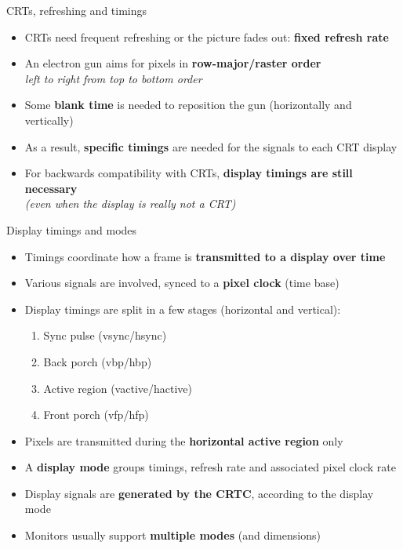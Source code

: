 \begin{frame}{CRTs, refreshing and timings}
  \begin{itemize}
  \item CRTs need frequent refreshing or the picture fades out: \textbf{fixed refresh rate}
  \item An electron gun aims for pixels in \textbf{row-major/raster order}\\
  \textit{left to right from top to bottom order}
  \item Some \textbf{blank time} is needed to reposition the gun (horizontally and vertically)
  \item As a result, \textbf{specific timings} are needed for the signals to each CRT display
  \item For backwards compatibility with CRTs, \textbf{display timings are still necessary}\\
    \textit{(even when the display is really not a CRT)}
  \end{itemize}
\end{frame}

\begin{frame}{Display timings and modes}
  \begin{itemize}
  \item Timings coordinate how a frame is \textbf{transmitted to a display over time}
  \item Various signals are involved, synced to a \textbf{pixel clock} (time base)
  \item Display timings are split in a few stages (horizontal and vertical):
    \begin{enumerate}
    \item Sync pulse (vsync/hsync)
    \item Back porch (vbp/hbp)
    \item Active region (vactive/hactive)
    \item Front porch (vfp/hfp)
    \end{enumerate}
  \item Pixels are transmitted during the \textbf{horizontal active region} only
  \item A \textbf{display mode} groups timings, refresh rate and associated pixel clock rate
  \item Display signals are \textbf{generated by the CRTC}, according to the display mode
  \item Monitors usually support \textbf{multiple modes} (and dimensions)
  \end{itemize}
\end{frame}

